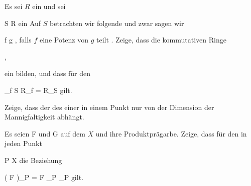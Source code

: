 {}
{





Es sei $R$ ein
und sei

\mavergleichskette
{\vergleichskette
{S
}
{ \subseteq }{ R
}
{  }{
}
{    }{
}
{   }{
}
}
{}{}{}
ein
Auf $S$ betrachten wir folgende
 {} {}
und zwar sagen wir

\mavergleichskette
{\vergleichskette
{f
}
{ \preccurlyeq }{g
}
{  }{
}
{    }{
}
{   }{
}
}
{}{}{,}
falls $f$ eine Potenz von $g$ teilt
 {} {.}
Zeige, dass die kommutativen Ringe

 { , }

ein
bilden, und dass für den

\mavergleichskettedisp
{\vergleichskette
{ _{f \in S} R_f
}
{ =} { R_S
}
{ } {
}
{ } {
}
{ } {
}
}
{}{}{}
gilt.





}
{} {}

{}
{





Zeige, dass der
des
einer
in einem Punkt nur von der Dimension der Mannigfaltigkeit
 {} {}
abhängt.





}
{} {}

{}
{





Es seien
\mathkor {} {{ \mathcal  F   }} {und} {{ \mathcal  G   }} {}
auf dem
$X$ und
 ihre Produktprägarbe. Zeige, dass für den
in jeden Punkt

\mavergleichskette
{\vergleichskette
{P
}
{ \in }{ X
}
{  }{
}
{    }{
}
{   }{
}
}
{}{}{}
die Beziehung

\mavergleichskettedisp
{\vergleichskette
{ \left(  { \mathcal  F   }    \right)_P
}
{ =} { { \mathcal  F   }_P _P
}
{ } {
}
{ } {
}
{ } {
}
}
{}{}{}
gilt.





}
{} {}

